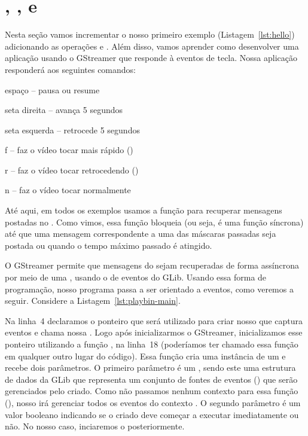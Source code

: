 \section{, ,  e~}
\label{sec:ops}
Nesta seção vamos incrementar o nosso primeiro exemplo 
(Listagem~\ref{lst:hello}) adicionando as operações  e . Além disso, vamos aprender como
desenvolver uma aplicação usando o GStreamer que responde à eventos de tecla.
Nossa aplicação responderá aos seguintes comandos: 
\begin{compactitem}
  \item espaço -- pausa ou resume
  \item seta direita -- avança 5 segundos
  \item seta esquerda -- retrocede 5 segundos
  \item f -- faz o vídeo tocar mais rápido ()
  \item r -- faz o vídeo tocar retrocedendo ()
  \item n -- faz o vídeo tocar normalmente
\end{compactitem}

Até aqui, em todos os exemplos usamos a função  
para recuperar mensagens postadas no . Como vimos, essa função bloqueia
(ou seja, é uma função síncrona) até que uma mensagem correspondente a uma 
das máscaras passadas seja postada ou quando o tempo máximo passado é 
atingido.

O GStreamer permite que mensagens do  sejam recuperadas de forma
assíncrona por meio de uma , usando o  de eventos do
 GLib. Usando essa forma de programação, nosso programa passa
a ser orientado a eventos, como veremos a seguir. Considere a
Listagem~\ref{lst:playbin-main}.



Na linha~4 declaramos o ponteiro  que será utilizado para 
criar nosso  que captura eventos e chama nossa . Logo
após inicializarmos o GStreamer, inicializamos esse ponteiro utilizando a
função , na linha~18 (poderíamos ter
chamado essa função em qualquer outro lugar do código). Essa função cria uma
instância de um  e recebe dois parâmetros. O primeiro parâmetro
é um , sendo este uma estrutura de dados da GLib que representa
um conjunto de fontes de eventos () que serão gerenciados 
pelo  criado. Como não passamos nenhum contexto para essa
função (), nosso  irá gerenciar todos os eventos do
contexto . O segundo parâmetro é um valor booleano
indicando se o  criado deve começar a executar imediatamente ou não.
No nosso caso, inciaremos o  posteriormente.

